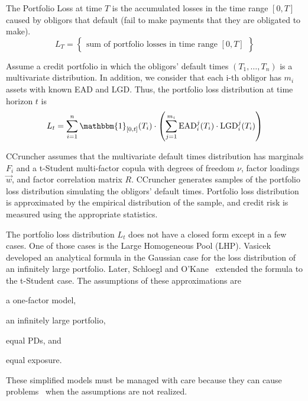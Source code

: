 \documentclass[11pt,fleqn]{book} %
\begin{document}
\begin{definition}
	The Portfolio Loss at time $T$ is the accumulated losses in the time 
	range $[0,T]$ caused by obligors that default (fail to make payments 
	that they are obligated to make).
	\begin{displaymath}
		L_T = \left\{
		\begin{array}{c}
			\text{sum of portfolio losses in time range $[0,T]$}
		\end{array}
		\right\}
	\end{displaymath}
\end{definition}

Assume a credit portfolio in which the obligors' default times 
$(T_1,\dots,T_n)$ is a multivariate distribution. In addition, we consider 
that each i-th obligor has $m_i$ assets with known EAD and LGD\@. Thus, 
the portfolio loss distribution at time horizon $t$ is
\begin{displaymath}
	L_t = \displaystyle \sum_{i=1}^n \mathbbm{1}_{[0,t]}(T_i) \cdot 
	\left( 
	\sum_{j=1}^{m_i} \text{EAD}_i^j(T_i) \cdot \text{LGD}_i^j(T_i)
	\right)
\end{displaymath}

CCruncher assumes that the multivariate default times distribution has
marginals $F_i$ and a t-Student multi-factor copula with degrees 
of freedom $\nu$, factor loadings $\vec{w}$, and factor correlation matrix 
$R$. CCruncher generates samples of the portfolio loss distribution simulating 
the obligors' default times. Portfolio loss distribution is approximated by the 
empirical distribution of the sample, and credit risk is measured using the 
appropriate statistics.

The portfolio loss distribution $L_t$ does not have a closed form except 
in a few cases. One of those cases is the Large Homogeneous Pool (LHP).
Vasicek~\cite{vasicek:1987} developed an analytical formula in the Gaussian 
case for the loss distribution of an infinitely large portfolio. Later, 
Schloegl and O'Kane~\cite{schloegl:2005} extended the formula to the 
t-Student case. The assumptions of these approximations are 
\begin{inparaenum}[1)]
	\item a one-factor model, 
	\item an infinitely large portfolio, 
	\item equal PDs, and
	\item equal exposure.
\end{inparaenum}
These simplified models must be managed with care because they can cause 
problems~\cite{long:2012} when the assumptions are not realized.
\end{document}
